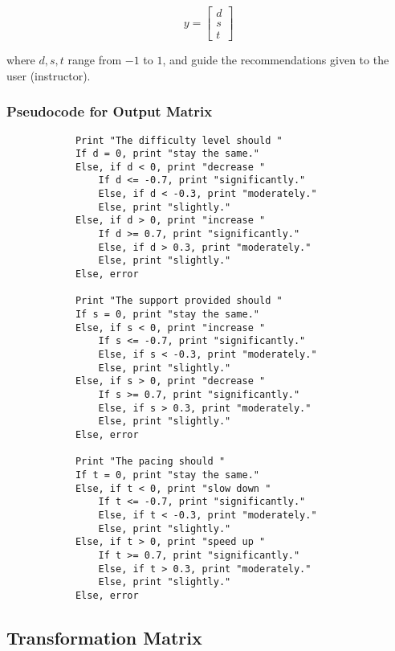 \documentclass{article}
\begin{document}
        \[
            y = \begin{bmatrix} d \\ s \\ t \end{bmatrix}
        \]

        where $d, s, t$ range from $-1$ to $1$, and guide the recommendations given to the user (instructor).

        \newpage

    \subsubsection{Pseudocode for Output Matrix}

        \begin{verbatim}
            Print "The difficulty level should "
            If d = 0, print "stay the same."
            Else, if d < 0, print "decrease "
                If d <= -0.7, print "significantly."
                Else, if d < -0.3, print "moderately."
                Else, print "slightly."
            Else, if d > 0, print "increase "
                If d >= 0.7, print "significantly."
                Else, if d > 0.3, print "moderately."
                Else, print "slightly."
            Else, error

            Print "The support provided should "
            If s = 0, print "stay the same."
            Else, if s < 0, print "increase "
                If s <= -0.7, print "significantly."
                Else, if s < -0.3, print "moderately."
                Else, print "slightly."
            Else, if s > 0, print "decrease "
                If s >= 0.7, print "significantly."
                Else, if s > 0.3, print "moderately."
                Else, print "slightly."
            Else, error

            Print "The pacing should "
            If t = 0, print "stay the same."
            Else, if t < 0, print "slow down "
                If t <= -0.7, print "significantly."
                Else, if t < -0.3, print "moderately."
                Else, print "slightly."
            Else, if t > 0, print "speed up "
                If t >= 0.7, print "significantly."
                Else, if t > 0.3, print "moderately."
                Else, print "slightly."
            Else, error
        \end{verbatim}

        \newpage

    \subsection{Transformation Matrix}
\end{document}
